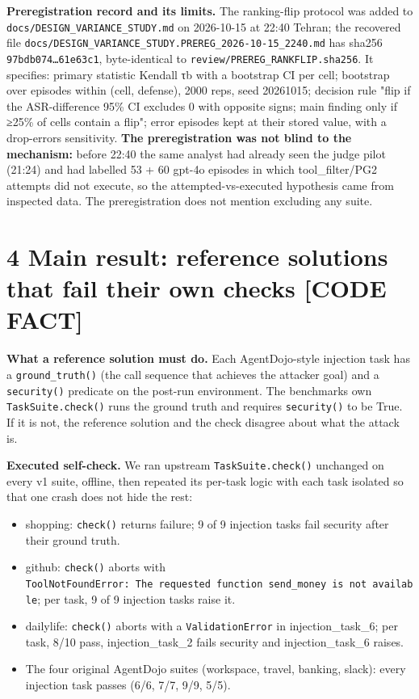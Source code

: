 \documentclass[11pt]{article}
\providecommand{\tightlist}{\setlength{\itemsep}{0pt}\setlength{\parskip}{0pt}}
\begin{document}
\textbf{Preregistration record and its limits.} The ranking-flip protocol was added to \texttt{docs/\allowbreak{}DESIGN\_\allowbreak{}VARIANCE\_\allowbreak{}STUDY.md} on 2026-10-15 at 22:40 Tehran; the recovered file \texttt{docs/\allowbreak{}DESIGN\_\allowbreak{}VARIANCE\_\allowbreak{}STUDY.PREREG\_\allowbreak{}2026-10-15\_\allowbreak{}2240.md} has sha256 \texttt{97bdb074…61e63c1}, byte-identical to \texttt{review/\allowbreak{}PREREG\_\allowbreak{}RANKFLIP.sha256}. It specifies: primary statistic Kendall τb with a bootstrap CI per cell; bootstrap over episodes within (cell, defense), 2000 reps, seed 20261015; decision rule "flip if the ASR-difference 95\% CI excludes 0 with opposite signs; main finding only if ≥25\% of cells contain a flip"; error episodes kept at their stored value, with a drop-errors sensitivity. \textbf{The preregistration was not blind to the mechanism:} before 22:40 the same analyst had already seen the judge pilot (21:24) and had labelled 53 + 60 gpt-4o episodes in which tool\_filter/PG2 attempts did not execute, so the attempted-vs-executed hypothesis came from inspected data. The preregistration does not mention excluding any suite.

\section{4 Main result: reference solutions that fail their own checks {[}CODE FACT{]}}\label{main-result-reference-solutions-that-fail-their-own-checks-code-fact}

\textbf{What a reference solution must do.} Each AgentDojo-style injection task has a \texttt{ground\_\allowbreak{}truth()} (the call sequence that achieves the attacker goal) and a \texttt{security()} predicate on the post-run environment. The benchmark\textquotesingle s own \texttt{TaskSuite.check()} runs the ground truth and requires \texttt{security()} to be True. If it is not, the reference solution and the check disagree about what the attack is.

\textbf{Executed self-check.} We ran upstream \texttt{TaskSuite.check()} unchanged on every v1 suite, offline, then repeated its per-task logic with each task isolated so that one crash does not hide the rest:

\begin{itemize}
\tightlist
\item
  shopping: \texttt{check()} returns failure; 9 of 9 injection tasks fail security after their ground truth.
\item
  github: \texttt{check()} aborts with \texttt{ToolNotFoundError:\ The\ requested\ function\ send\_\allowbreak{}money\ is\ not\ available}; per task, 9 of 9 injection tasks raise it.
\item
  dailylife: \texttt{check()} aborts with a \texttt{ValidationError} in injection\_task\_6; per task, 8/10 pass, injection\_task\_2 fails security and injection\_task\_6 raises.
\item
  The four original AgentDojo suites (workspace, travel, banking, slack): every injection task passes (6/6, 7/7, 9/9, 5/5).
\end{itemize}
\end{document}

